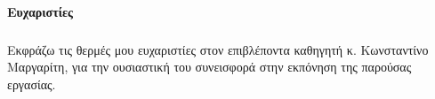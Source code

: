 \clearpage
{}
\begin{flushleft}

{\large \textbf{}}\\[0.5 cm]
\end{flushleft}
\indent \textbf{}

\clearpage
{}
\begin{flushleft}
{\large \textbf{Ευχαριστίες}}\\[0.5 cm]
\end{flushleft}
\subparagraph{}
Εκφράζω τις θερμές μου ευχαριστίες στον επιβλέποντα καθηγητή κ. Κωνσταντίνο Μαργαρίτη, για την
ουσιαστική του συνεισφορά στην εκπόνηση της παρούσας εργασίας.

\clearpage
\singlespacing
\tableofcontents

\renewcommand{\listfigurename}{Κατάλογος Εικόνων (αν υπάρχουν)}
\clearpage
\listoffigures

\renewcommand{\listtablename}{Κατάλογος Πινάκων (αν υπάρχουν)}
\clearpage
\listoftables

\clearpage
\begin{flushleft}
\lstlistoflistings
\end{flushleft}

\clearpage
\setcounter{page}{1}
